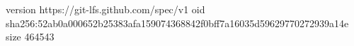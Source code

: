 version https://git-lfs.github.com/spec/v1
oid sha256:52ab0a000652b25383afa159074368842f0bff7a16035d59629770272939a14e
size 464543

